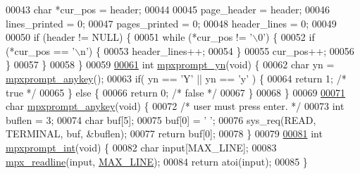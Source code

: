 \begin{DoxyCode}
{{00043         \textcolor{keywordtype}{char} *cur\_pos   = header;
00044 
00045         page\_header     = header;
00046         lines\_printed   = 0;
00047         pages\_printed   = 0;
00048         header\_lines    = 0;
00049 
00050         \textcolor{keywordflow}{if} (header != NULL) \{
00051                 \textcolor{keywordflow}{while} (*cur\_pos != \textcolor{charliteral}{'\(\backslash\)0'}) \{
00052                         \textcolor{keywordflow}{if} (*cur\_pos == \textcolor{charliteral}{'\(\backslash\)n'}) \{
00053                                 header\_lines++;
00054                         \}
00055                         cur\_pos++;
00056                 \}
00057         \}
00058 \}
00059 
\hypertarget{mpx__util_8c_source_l00061}{}\hyperlink{mpx__util_8h_a8e31250a20e8bc8e7106f5a37c391199}{00061} \textcolor{keywordtype}{int} \hyperlink{mpx__util_8c_a8e31250a20e8bc8e7106f5a37c391199}{mpxprompt_yn}(\textcolor{keywordtype}{void}) \{
00062         \textcolor{keywordtype}{char} yn = \hyperlink{mpx__util_8c_a338d01dfe3c80732c00450203c85b964}{mpxprompt_anykey}();
00063         \textcolor{keywordflow}{if}( yn == \textcolor{charliteral}{'Y'} || yn == \textcolor{charliteral}{'y'} ) \{
00064                 \textcolor{keywordflow}{return} 1; \textcolor{comment}{/* true */}
00065         \} \textcolor{keywordflow}{else} \{
00066                 \textcolor{keywordflow}{return} 0; \textcolor{comment}{/* false */}
00067         \}
00068 \}
00069 
\hypertarget{mpx__util_8c_source_l00071}{}\hyperlink{mpx__util_8h_a338d01dfe3c80732c00450203c85b964}{00071} \textcolor{keywordtype}{char} \hyperlink{mpx__util_8c_a338d01dfe3c80732c00450203c85b964}{mpxprompt_anykey}(\textcolor{keywordtype}{void}) \{
00072         \textcolor{comment}{/* user must press enter. */}
00073         \textcolor{keywordtype}{int} buflen = 3;
00074         \textcolor{keywordtype}{char} buf[5];
00075         buf[0] = \textcolor{charliteral}{' '};
00076         sys\_req(READ, TERMINAL, buf, &buflen);
00077         \textcolor{keywordflow}{return} buf[0];
00078 \}
00079 
\hypertarget{mpx__util_8c_source_l00081}{}\hyperlink{mpx__util_8h_aacc3dfe470919b0bd1133bce90383e18}{00081} \textcolor{keywordtype}{int} \hyperlink{mpx__util_8c_aacc3dfe470919b0bd1133bce90383e18}{mpxprompt_int}(\textcolor{keywordtype}{void}) \{
00082         \textcolor{keywordtype}{char} input[MAX\_LINE];
00083         \hyperlink{mpx__util_8c_a781169ab05ad54c0d37253d73060b77f}{mpx_readline}(input, \hyperlink{mpx__cmd_8h_a842ed03f27719bc87666bfd1f75415b8}{MAX_LINE});  
00084         \textcolor{keywordflow}{return} atoi(input);
00085 \}
}}
\end{DoxyCode}
